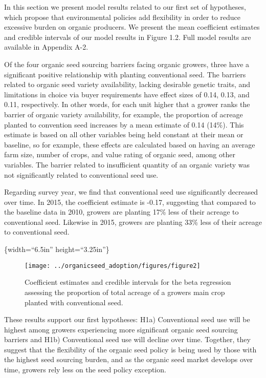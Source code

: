 \documentclass[twoside,12pt,final]{ucthesis-CA2012}
\begin{document}
\begin{ucmainmatter}
In this section we present model results related to our first set of
hypotheses, which propose that environmental policies add flexibility in
order to reduce excessive burden on organic producers. We present the
mean coefficient estimates and credible intervals of our model results
in Figure 1.2. Full model results are available in Appendix A-2.

Of the four organic seed sourcing barriers facing organic growers, three
have a significant positive relationship with planting conventional
seed. The barriers related to organic seed variety availability, lacking
desirable genetic traits, and limitations in choice via buyer
requirements have effect sizes of 0.14, 0.13, and 0.11, respectively. In
other words, for each unit higher that a grower ranks the barrier of
organic variety availability, for example, the proportion of acreage
planted to convention seed increases by a mean estimate of 0.14 (14\%).
This estimate is based on all other variables being held constant at
their mean or baseline, so for example, these effects are calculated
based on having an average farm size, number of crops, and value rating
of organic seed, among other variables. The barrier related to
insufficient quantity of an organic variety was not significantly
related to conventional seed use.

Regarding survey year, we find that conventional seed use significantly
decreased over time. In 2015, the coefficient estimate is -0.17,
suggesting that compared to the baseline data in 2010, growers are
planting 17\% less of their acreage to conventional seed. Likewise in
2015, growers are planting 33\% less of their acreage to conventional
seed.

\{width=``6.5in'' height=``3.25in''\}
\begin{figure}

{\centering \texttt{[image: ../organicseed\_adoption/figures/figure2]} 

}

\caption{Coefficient estimates and credible intervals for the beta regression assessing the proportion of total acreage of a growers main crop planted with conventional seed.}\label{fig:unnamed-chunk-12}
\end{figure}
These results support our first hypotheses: H1a) Conventional seed use
will be highest among growers experiencing more significant organic seed
sourcing barriers and H1b) Conventional seed use will decline over time.
Together, they suggest that the flexibility of the organic seed policy
is being used by those with the highest seed sourcing burden, and as the
organic seed market develops over time, growers rely less on the seed
policy exception.


\end{ucmainmatter}
\end{document}
